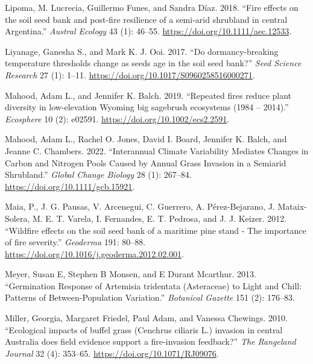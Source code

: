 \documentclass[
  12pt,
]{article}
\newlength{\cslhangindent}
\newlength{\cslentryspacingunit} %
\newenvironment{CSLReferences}[2] %
 {%
  \setlength{\parindent}{0pt}
  \ifodd #1
  \let\oldpar\par
  \def\par{\hangindent=\cslhangindent\oldpar}
  \fi
  \setlength{\parskip}{#2\cslentryspacingunit}
 }%
 {}
\begin{document}
\begin{CSLReferences}{1}{0}
\leavevmode{}%
Lipoma, M. Lucrecia, Guillermo Funes, and Sandra Díaz. 2018. {``{Fire
effects on the soil seed bank and post-fire resilience of a semi-arid
shrubland in central Argentina}.''} \emph{Austral Ecology} 43 (1):
46--55. \url{https://doi.org/10.1111/aec.12533}.

\leavevmode{}%
Liyanage, Ganesha S., and Mark K. J. Ooi. 2017. {``{Do dormancy-breaking
temperature thresholds change as seeds age in the soil seed bank?}''}
\emph{Seed Science Research} 27 (1): 1--11.
\url{https://doi.org/10.1017/S0960258516000271}.

\leavevmode{}%
Mahood, Adam L., and Jennifer K. Balch. 2019. {``{Repeated fires reduce
plant diversity in low-elevation Wyoming big sagebrush ecosystems (1984
-- 2014)}.''} \emph{Ecosphere} 10 (2): e02591.
\url{https://doi.org/10.1002/ecs2.2591}.

\leavevmode{}%
Mahood, Adam L., Rachel O. Jones, David I. Board, Jennifer K. Balch, and
Jeanne C. Chambers. 2022. {``Interannual Climate Variability Mediates
Changes in Carbon and Nitrogen Pools Caused by Annual Grass Invasion in
a Semiarid Shrubland.''} \emph{Global Change Biology} 28 (1): 267--84.
\url{https://doi.org/10.1111/gcb.15921}.

\leavevmode{}%
Maia, P., J. G. Pausas, V. Arcenegui, C. Guerrero, A. Pérez-Bejarano, J.
Mataix-Solera, M. E. T. Varela, I. Fernandes, E. T. Pedrosa, and J. J.
Keizer. 2012. {``{Wildfire effects on the soil seed bank of a maritime
pine stand - The importance of fire severity}.''} \emph{Geoderma} 191:
80--88. \url{https://doi.org/10.1016/j.geoderma.2012.02.001}.

\leavevmode{}%
Meyer, Susan E, Stephen B Monsen, and E Durant Mcarthur. 2013.
{``{Germination Response of Artemisia tridentata (Asteraceae) to Light
and Chill: Patterns of Between-Population Variation}.''} \emph{Botanical
Gazette} 151 (2): 176--83.

\leavevmode{}%
Miller, Georgia, Margaret Friedel, Paul Adam, and Vanessa Chewings.
2010. {``{Ecological impacts of buffel grass (Cenchrus ciliaris L.)
invasion in central Australia does field evidence support a
fire-invasion feedback?}''} \emph{The Rangeland Journal} 32 (4):
353--65. \url{https://doi.org/10.1071/RJ09076}.


\end{CSLReferences}
\end{document}
